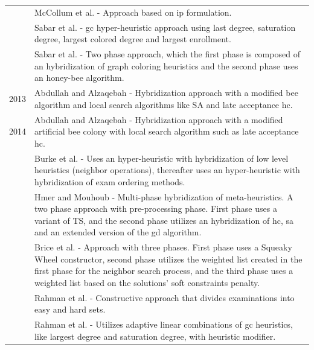 \begin{table}
{\begin{tabular}{@{\,}r <{\hskip 2pt} !{\foo} >{\raggedright\arraybackslash}p{15cm}}
		& McCollum et al. - Approach based on \gls{ip} formulation.\\
		& Sabar et al. - \gls{gc} hyper-heuristic approach using last degree, saturation degree, largest colored degree and largest enrollment.\\
		& Sabar et al. - Two phase approach, which the first phase is composed of an hybridization of graph coloring heuristics and the second phase uses an honey-bee algorithm.\\
2013	& Abdullah and Alzaqebah - Hybridization approach with a modified bee algorithm and local search algorithms like SA and late acceptance \gls{hc}.\\
2014	& Abdullah and Alzaqebah - Hybridization approach with a modified artificial bee colony with local search algorithm such as late acceptance \gls{hc}.\\
		& Burke et al. - Uses an hyper-heuristic with hybridization of low level heuristics (neighbor operations), thereafter uses an hyper-heuristic with hybridization of exam ordering methods.\\
		& Hmer and Mouhoub - Multi-phase hybridization of meta-heuristics. A two phase approach with pre-processing phase. First phase uses a variant of TS, and the second phase utilizes an hybridization of \gls{hc}, \gls{sa} and an extended version of the \gls{gd} algorithm.\\
		& Brice et al. - Approach with three phases. First phase uses a Squeaky Wheel constructor, second phase utilizes the weighted list created in the first phase for the neighbor search process, and the third phase uses a weighted list based on the solutions' soft constraints penalty.\\
		& Rahman et al. - Constructive approach that divides examinations into easy and hard sets.\\
		& Rahman et al. - Utilizes adaptive linear combinations of \gls{gc} heuristics, like largest degree and saturation degree, with heuristic modifier.\\
		
\end{tabular}
\label{table:timetable}
}
\end{table}
